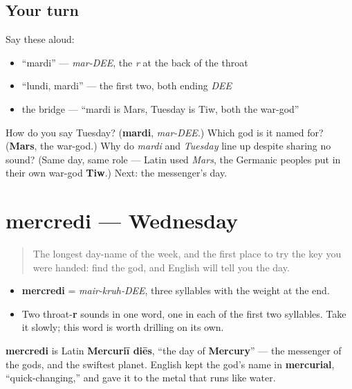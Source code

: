 \subsection*{Your turn}
Say these aloud:

\begin{itemize}
\raggedright
  \item \textquotedblleft{}mardi\textquotedblright{} — \emph{mar-DEE}, the \emph{r} at the back of the throat
  \item \textquotedblleft{}lundi, mardi\textquotedblright{} — the first two, both ending \emph{DEE}
  \item the bridge — \textquotedblleft{}mardi is Mars, Tuesday is Tiw, both the war-god\textquotedblright{}
\end{itemize}

\begin{tcolorbox}[breakable,colback=teal!4,colframe=teal!35!black,title={Before you move on}]
How do you say Tuesday? (\textbf{mardi}, \emph{mar-DEE}.) Which god is it named for? (\textbf{Mars}, the war-god.) Why do \emph{mardi} and \emph{Tuesday} line up despite sharing no sound? (Same day, same role — Latin used \emph{Mars}, the Germanic peoples put in their own war-god \textbf{Tiw}.) Next: the messenger's day.
\end{tcolorbox}
\section[mercredi]{mercredi — Wednesday}

\label{lesson:FR-C07-mercredi}



\begin{quote}
The longest day-name of the week, and the first place to try the key you were handed: find the god, and English will tell you the day.
\end{quote}

\begin{sounds}
\begin{itemize}
\raggedright
  \item \textbf{mercredi} = \emph{mair-kruh-DEE}, three syllables with the weight at the end.
  \item Two throat-\textbf{r} sounds in one word, one in each of the first two syllables. Take it slowly; this word is worth drilling on its own.
\end{itemize}
\end{sounds}

\begin{cousinweb}
\textbf{mercredi} is Latin \textbf{Mercuriī diēs}, \textquotedblleft{}the day of \textbf{Mercury}\textquotedblright{} — the messenger of the gods, and the swiftest planet. English kept the god's name in \textbf{mercurial}, \textquotedblleft{}quick-changing,\textquotedblright{} and gave it to the metal that runs like water.
\end{cousinweb}

